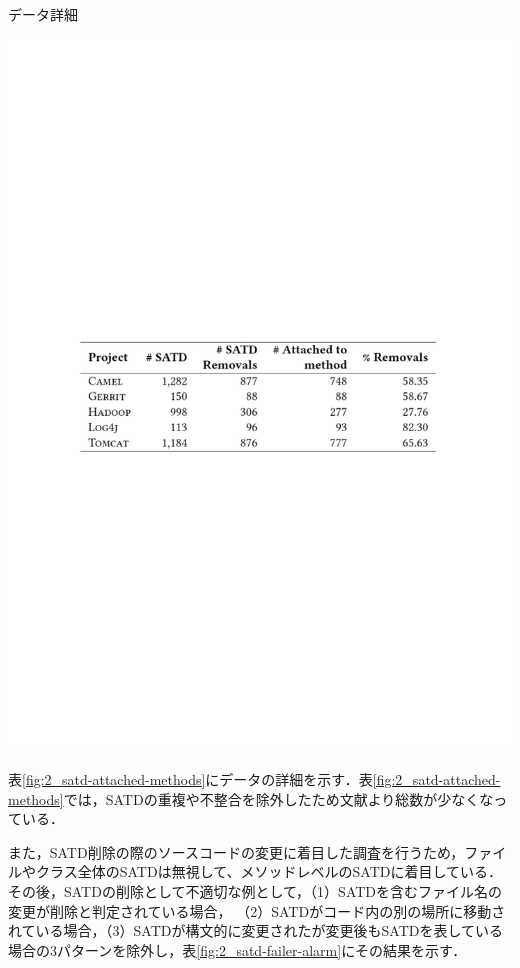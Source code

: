 \begin{table}[t]
    \centering
    \caption{データ詳細}
    \includegraphics[width=0.9\linewidth, angle=0]{./thesis2/satd-attached-methods2.pdf}
    \label{fig:2_satd-attached-methods}
\end{table}

表\ref{fig:2_satd-attached-methods}にデータの詳細を示す．表\ref{fig:2_satd-attached-methods}では，SATDの重複や不整合を除外したため文献\cite{satd-removal}より総数が少なくなっている．

また，SATD削除の際のソースコードの変更に着目した調査を行うため，ファイルやクラス全体のSATDは無視して、メソッドレベルのSATDに着目している．
その後，SATDの削除として不適切な例として，（1）SATDを含むファイル名の変更が削除と判定されている場合， （2）SATDがコード内の別の場所に移動されている場合，（3）SATDが構文的に変更されたが変更後もSATDを表している場合の3パターンを除外し，表\ref{fig:2_satd-failer-alarm}にその結果を示す．

